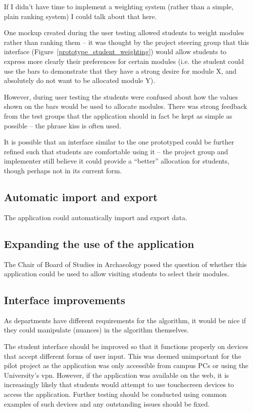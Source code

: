 \documentclass[]{scrartcl}
\begin{document}
If I didn't have time to implement a weighting system (rather than a simple,
plain ranking system) I could talk about that here.

One mockup created during the user testing allowed students to weight modules
rather than ranking them -- it was thought by the project steering group that
this interface (Figure~\ref{prototype_student_weighting}) would allow students
to express more clearly their preferences for certain modules (i.e. the
student could use the bars to demonstrate that they have a strong desire for
module X, and absolutely do not want to be allocated module Y).

However, during user testing the students were confused about how the values
shown on the bars would be used to allocate modules. There was strong feedback
from the test groups that the application should in fact be kept as simple as
possible -- the phrase \gls{kiss} is often used.

It is possible that an interface similar to the one prototyped could be
further refined such that students are comfortable using it -- the project
group and implementer still believe it could provide a ``better'' allocation
for students, though perhaps not in its current form.

\subsection{Automatic import and export}
\label{sec:autoexport}

The application could automatically import and export data.

\subsection{Expanding the use of the application}

The Chair of Board of Studies in Archaeology posed the question of whether
this application could be used to allow visiting students to select their
modules.

\subsection{Interface improvements}

As departments have different requirements for the algorithm, it would be nice
if they could manipulate (nuances) in the algorithm themselves.

The student interface should be improved so that it functions properly on
devices that accept different forms of user input. This was deemed unimportant
for the pilot project as the application was only accessible from campus PCs
or using the University's \gls{vpn}. However, if the application was available
on the web, it is increasingly likely that students would attempt to use
touchscreen devices to access the application. Further testing should be
conducted using common examples of such devices and any outstanding issues
should be fixed.
\end{document}
